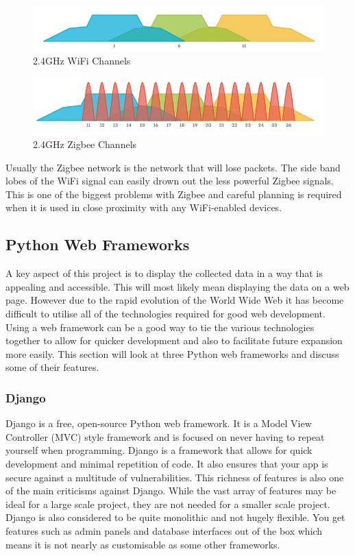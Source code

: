 \documentclass[10pt,a4paper]{article}
\begin{document}
\begin{figure}[H]
\centering
  \includegraphics[width=\linewidth]{images/wifi_channels.png}
  \caption{2.4GHz WiFi Channels\cite{zigbeechannels}}
  \label{fig:wifichannels}
\end{figure}

\begin{figure}[H]
\centering
  \includegraphics[width=\linewidth]{images/zigbee_channels.png}
  \caption{2.4GHz Zigbee Channels\cite{zigbeechannels}}
  \label{fig:zigbeechannels}
\end{figure}

Usually the Zigbee network is the network that will lose packets. The side band lobes of the WiFi signal can easily drown out the less powerful Zigbee signals. This is one of the biggest problems with Zigbee and careful planning is required when it is used in close proximity with any WiFi-enabled devices.

\subsection{Python Web Frameworks}
A key aspect of this project is to display the collected data in a way that is appealing and accessible. This will most likely mean displaying the data on a web page. However due to the rapid evolution of the World Wide Web it has become difficult to utilise all of the technologies required for good web development\cite{pop_altar_2014}. Using a web framework can be a good way to tie the various technologies together to allow for quicker development and also to facilitate future expansion more easily. This section will look at three Python web frameworks and discuss some of their features. 
\subsubsection{Django}
Django\cite{website:django} is a free, open-source Python web framework. It is a Model View Controller (MVC) style framework and is focused on never having to repeat yourself when programming. Django is a framework that allows for quick development and minimal repetition of code. It also ensures that your app is secure against a multitude of vulnerabilities. This richness of features is also one of the main criticisms against Django. While the vast array of features may be ideal for a large scale project, they are not needed for a smaller scale project. Django is also considered to be quite monolithic and not hugely flexible. You get features such as admin panels and database interfaces out of the box which means it is not nearly as customisable as some other frameworks. 
\end{document}
